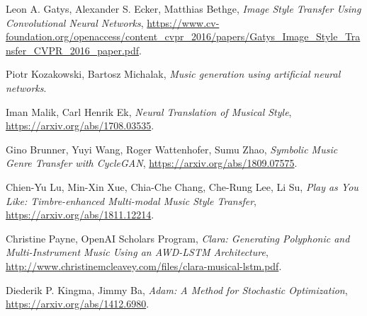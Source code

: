 \documentclass[en]{pracamgr}
\begin{document}
\begin{thebibliography}{99}

 Leon A. Gatys, Alexander S. Ecker, Matthias Bethge, \textit{Image Style Transfer Using Convolutional Neural Networks}, \url{https://www.cv-foundation.org/openaccess/content_cvpr_2016/papers/Gatys_Image_Style_Transfer_CVPR_2016_paper.pdf}.

 Piotr Kozakowski, Bartosz Michalak, \textit{Music generation using artificial neural networks}.

 Iman Malik, Carl Henrik Ek, \textit{Neural Translation of Musical Style}, \url{https://arxiv.org/abs/1708.03535}.

 Gino Brunner, Yuyi Wang, Roger Wattenhofer, Sumu Zhao, \textit{Symbolic Music Genre Transfer with CycleGAN}, \url{https://arxiv.org/abs/1809.07575}.

 Chien-Yu Lu, Min-Xin Xue, Chia-Che Chang, Che-Rung Lee, Li Su, \textit{Play as You Like: Timbre-enhanced Multi-modal Music Style Transfer}, \url{https://arxiv.org/abs/1811.12214}.

 Christine Payne, OpenAI Scholars Program, \textit{Clara: Generating Polyphonic and Multi-Instrument Music Using an AWD-LSTM Architecture}, \url{http://www.christinemcleavey.com/files/clara-musical-lstm.pdf}.

 Diederik P. Kingma, Jimmy Ba, \textit{Adam: A Method for Stochastic Optimization}, \url{https://arxiv.org/abs/1412.6980}.

\end{thebibliography}
\end{document}
